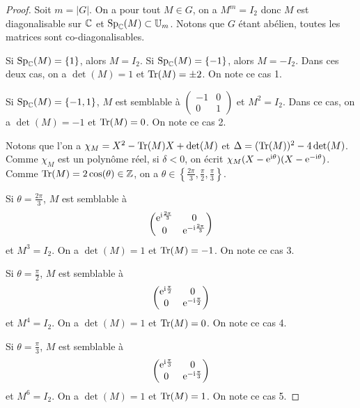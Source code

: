 \documentclass[12pt]{article}
\begin{document}
\begin{proof}
	Soit $m=\left\lvert G\right\rvert$. On a pour tout $M\in G$, on a $M^{m}=I_{2}$ donc $M$ est diagonalisable sur $\mathbb{C}$ et $\operatorname{Sp}_{\mathbb{C}}(M)\subset\mathbb{U}_{m}$. Notons que $G$ étant abélien, toutes les matrices sont co-diagonalisables.

	Si $\operatorname{Sp}_{\mathbb{C}}(M)=\lbrace1\rbrace$, alors $M=I_{2}$. Si $\operatorname{Sp}_{\mathbb{C}}(M)=\lbrace-1\rbrace$, alors $M=-I_{2}$. Dans ces deux cas, on a $\det(M)=1$ et $\operatorname{Tr}(M)=\pm2$. On note ce cas 1.
	
	Si $\operatorname{Sp}_{\mathbb{C}}(M)=\lbrace-1,1\rbrace$, $M$ est semblable à $\begin{pmatrix}
		-1&0\\
		0&1
	\end{pmatrix}$ et $M^{2}=I_{2}$. Dans ce cas, on a $\det(M)=-1$ et $\operatorname{Tr}(M)=0$. On note ce cas 2.

	Notons que l'on a $\chi_{M}=X^{2}-\operatorname{Tr}(M)X+\det(M)$ et $\Delta=(\operatorname{Tr}(M))^{2}-4\det(M)$. Comme $\chi_{M}$ est un polynôme réel, si $\delta<0$, on écrit $\chi_{M}(X-\mathrm{e}^{\mathrm{i}\theta})(X-\mathrm{e}^{-\mathrm{i}\theta})$. Comme $\operatorname{Tr}(M)=2\cos(\theta)\in\mathbb{Z}$, on a $\theta\in\left\lbrace\frac{2\pi}{3},\frac{\pi}{2},\frac{\pi}{3}\right\rbrace$.

	Si $\theta=\frac{2\pi}{3}$, $M$ est semblable à 
	\begin{equation}
		\begin{pmatrix}
			\mathrm{e}^{\mathrm{i}\frac{2\pi}{3}}&0\\
			0&\mathrm{e}^{-\mathrm{i}\frac{2\pi}{3}}
		\end{pmatrix}
	\end{equation}
	et $M^{3}=I_{2}$. On a $\det(M)=1$ et $\operatorname{Tr}(M)=-1$. On note ce cas 3.

	Si $\theta=\frac{\pi}{2}$, $M$ est semblable à 
	\begin{equation}
		\begin{pmatrix}
			\mathrm{e}^{\mathrm{i}\frac{\pi}{2}}&0\\
			0&\mathrm{e}^{-\mathrm{i}\frac{\pi}{2}}
		\end{pmatrix}
	\end{equation}
	et $M^{4}=I_{2}$. On a $\det(M)=1$ et $\operatorname{Tr}(M)=0$. On note ce cas 4.

	Si $\theta=\frac{\pi}{3}$, $M$ est semblable à 
	\begin{equation}
		\begin{pmatrix}
			\mathrm{e}^{\mathrm{i}\frac{\pi}{3}}&0\\
			0&\mathrm{e}^{-\mathrm{i}\frac{\pi}{3}}
		\end{pmatrix}
	\end{equation}
	et $M^{6}=I_{2}$. On a $\det(M)=1$ et $\operatorname{Tr}(M)=1$. On note ce cas 5.


\end{proof}
\end{document}
